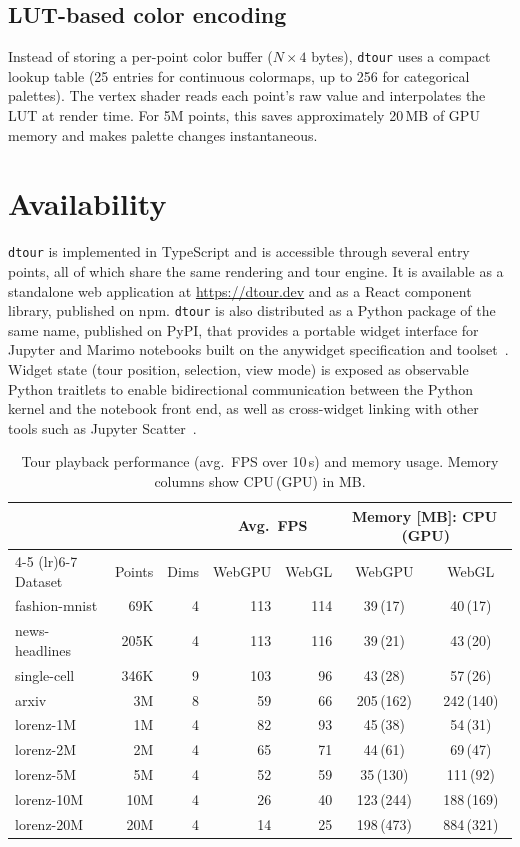 \documentclass[11pt]{article}
\newcommand{\dtour}{\texorpdfstring{\texttt{dtour}\xspace}{dtour}}
\begin{document}
\subsection{LUT-based color encoding}
Instead of storing a per-point color buffer ($N \times 4$ bytes), \dtour{} uses a compact lookup table (25 entries for continuous colormaps, up to 256 for categorical palettes). The vertex shader reads each point's raw value and interpolates the LUT at render time. For 5M points, this saves approximately 20\,MB of GPU memory and makes palette changes instantaneous.

\section{Availability}
\dtour{} is implemented in TypeScript and is accessible through several entry points, all of which share the same rendering and tour engine. It is available as a standalone web application at \url{https://dtour.dev} and as a React component library, published on npm. \dtour{} is also distributed as a Python package of the same name, published on PyPI, that provides a portable widget interface for Jupyter and Marimo notebooks built on the anywidget specification and toolset~\cite{anywidget_scipy}. Widget state (tour position, selection, view mode) is exposed as observable Python traitlets to enable bidirectional communication between the Python kernel and the notebook front end, as well as cross-widget linking with other tools such as Jupyter Scatter~\cite{lekschas2024jupyter}. 

\begin{table}[t]
  \caption{Tour playback performance (avg.\ FPS over 10\,s) and memory usage. Memory columns show CPU\,(GPU) in MB.}
  \label{tab:benchmarks}
  \centering
  \small
  \begin{tabular}{lrr rr cc}
    \toprule
    & & & \multicolumn{2}{c}{Avg.\ FPS} & \multicolumn{2}{c}{Memory [MB]: CPU\,(GPU)} \\
    \cmidrule(lr){4-5} \cmidrule(lr){6-7}
    Dataset & Points & Dims & WebGPU & WebGL & WebGPU & WebGL \\
    \midrule
    fashion-mnist  &   69K &  4 & 113 & 114 &  39\,(17) &   40\,(17) \\
    news-headlines &  205K &  4 & 113 & 116 &  39\,(21) &   43\,(20) \\
    single-cell    &  346K &  9 & 103 &  96 &  43\,(28) &   57\,(26) \\
    arxiv          &    3M &  8 &  59 &  66 & 205\,(162) &  242\,(140) \\
    lorenz-1M      &    1M &  4 &  82 &  93 &  45\,(38) &   54\,(31) \\
    lorenz-2M      &    2M &  4 &  65 &  71 &  44\,(61) &   69\,(47) \\
    lorenz-5M      &    5M &  4 &  52 &  59 &  35\,(130) &  111\,(92) \\
    lorenz-10M     &   10M &  4 &  26 &  40 & 123\,(244) &  188\,(169) \\
    lorenz-20M     &   20M &  4 &  14 &  25 & 198\,(473) &  884\,(321) \\
    \bottomrule
  \end{tabular}
\end{table}
\end{document}
